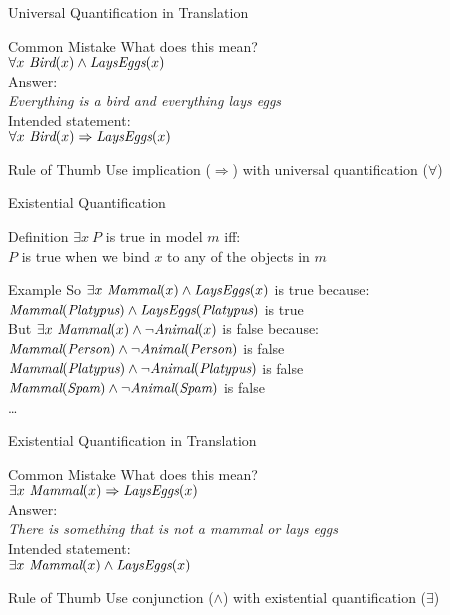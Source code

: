 \documentclass[12pt]{beamer}
\newcommand{\EM}[1]{\mbox{\em#1}}
\newcommand{\tab}{\hspace{1em}}
\newcommand{\limpl}{\Rightarrow}
\begin{document}
\begin{frame}{Universal Quantification in Translation}
	\begin{block}{Common Mistake}
		What does this mean? \\
		\tab\tab$\forall x\ \EM{Bird}(x) \land \EM{LaysEggs}(x)$ \\
		\pause
		Answer: \\
		\tab\tab\emph{Everything is a bird and everything lays eggs} \\
		Intended statement: \\
		\tab\tab$\forall x\ \EM{Bird}(x) \limpl \EM{LaysEggs}(x)$ \\
	\end{block}
	\pause
	\begin{block}{Rule of Thumb}
		Use implication ($\limpl$) with universal quantification ($\forall$)
	\end{block}
\end{frame}
\begin{frame}{Existential Quantification}
	\begin{block}{Definition}
		$\exists x\ P$ is true in model $m$ iff: \\
		\tab\tab$P$ is true when we bind $x$ to \alert{any} of the objects in $m$
	\end{block}
	\pause
	\begin{block}{Example}
		So $\exists x\ \EM{Mammal}(x) \land \EM{LaysEggs}(x)$ is true because: \\
		\pause
		\tab\tab$\EM{Mammal}(\EM{Platypus}) \land \EM{LaysEggs}(\EM{Platypus})$ is true \\[.5em]
		\pause
		But $\exists x\ \EM{Mammal}(x) \land \lnot\EM{Animal}(x)$ is false because: \\
		\pause
		\tab\tab$\EM{Mammal}(\EM{Person}) \land \lnot\EM{Animal}(\EM{Person})$ is false \\
		\tab\tab$\EM{Mammal}(\EM{Platypus}) \land \lnot\EM{Animal}(\EM{Platypus})$ is false \\
		\tab\tab$\EM{Mammal}(\EM{Spam}) \land \lnot\EM{Animal}(\EM{Spam})$ is false \\
		\tab\tab\ldots \\
	\end{block}
\end{frame}
\begin{frame}{Existential Quantification in Translation}
	\begin{block}{Common Mistake}
		What does this mean? \\
		\tab\tab$\exists x\ \EM{Mammal}(x) \limpl \EM{LaysEggs}(x)$ \\
		\pause
		Answer: \\
		\tab\tab\emph{There is something that is not a mammal or lays eggs} \\
		Intended statement: \\
		\tab\tab$\exists x\ \EM{Mammal}(x) \land \EM{LaysEggs}(x)$ \\
	\end{block}
	\pause
	\begin{block}{Rule of Thumb}
		Use conjunction ($\land$) with existential quantification ($\exists$)
	\end{block}
\end{frame}
\end{document}
